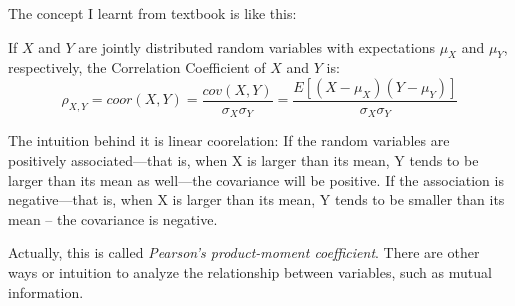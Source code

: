 \documentclass[a4paper]{book}
\newenvironment{definition}[1][Definition]{\begin{trivlist}
\item[\hskip \labelsep {\bfseries #1}]}{\end{trivlist}}
\begin{document}
	The concept I learnt from textbook is like this:

	\begin{definition}
		If $X$ and $Y$ are jointly distributed random variables with
		expectations $\mu_X$ and $\mu_Y$, respectively, the Correlation
		Coefficient of $X$ and $Y$ is:
		\begin{displaymath}
			\rho_{X,Y} = coor(X,Y) = \frac{cov(X,Y)}{\sigma_X\sigma_Y} = \frac{E[(X
			- \mu_X)(Y - \mu_Y)]}{\sigma_X\sigma_Y}
		\end{displaymath}
	\end{definition}

	The intuition behind it is linear coorelation: If the random variables
	are positively associated—that is, when X is larger than its mean, Y
	tends to be larger than its mean as well—the covariance will be
	positive. If the association is negative—that is, when X is larger
	than its mean, Y tends to be smaller than its mean -- the covariance
	is negative.\cite{rice2007mathematical}

	Actually, this is called \textit{Pearson's product-moment
	coefficient}.\cite{wiki_Correlation_and_dependence} There are other ways or intuition to analyze the
	relationship between variables, such as mutual information.




\end{document}
